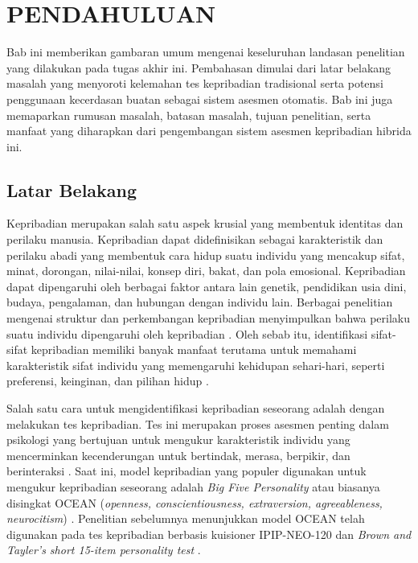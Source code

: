 \chapter{PENDAHULUAN}
\label{chap:pendahuluan}

Bab ini memberikan gambaran umum mengenai keseluruhan landasan penelitian yang dilakukan pada tugas akhir ini. Pembahasan dimulai dari latar belakang masalah yang menyoroti kelemahan tes kepribadian tradisional serta potensi penggunaan kecerdasan buatan sebagai sistem asesmen otomatis. Bab ini juga memaparkan rumusan masalah, batasan masalah, tujuan penelitian, serta manfaat yang diharapkan dari pengembangan sistem asesmen kepribadian hibrida ini.

\section{Latar Belakang}
\label{sec:latarbelakang}

Kepribadian merupakan salah satu aspek krusial yang membentuk identitas dan perilaku manusia. Kepribadian dapat didefinisikan sebagai karakteristik dan perilaku abadi yang membentuk cara hidup suatu individu yang mencakup sifat, minat, dorongan, nilai-nilai, konsep diri, bakat, dan pola emosional. Kepribadian dapat dipengaruhi oleh berbagai faktor antara lain genetik, pendidikan usia dini, budaya, pengalaman, dan hubungan dengan individu lain. Berbagai penelitian mengenai struktur dan perkembangan kepribadian menyimpulkan bahwa perilaku suatu individu dipengaruhi oleh kepribadian \parencite{apa-personality}. Oleh sebab itu, identifikasi sifat-sifat kepribadian memiliki banyak manfaat terutama untuk memahami karakteristik sifat individu yang memengaruhi kehidupan sehari-hari, seperti preferensi, keinginan, dan pilihan hidup \parencite{Ilmini2024}.

Salah satu cara untuk mengidentifikasi kepribadian seseorang adalah dengan melakukan tes kepribadian. Tes ini merupakan proses asesmen penting dalam psikologi yang bertujuan untuk mengukur karakteristik individu yang mencerminkan kecenderungan untuk bertindak, merasa, berpikir, dan berinteraksi \parencite{Krishnamurthy2022}. Saat ini, model kepribadian yang populer digunakan untuk mengukur kepribadian seseorang adalah \textit{Big Five Personality} atau biasanya disingkat OCEAN (\textit{openness, conscientiousness, extraversion, agreeableness, neurocitism}) \parencite{Suman2022,Ilmini2024}. Penelitian sebelumnya menunjukkan model OCEAN telah digunakan pada tes kepribadian berbasis kuisioner IPIP-NEO-120 dan \textit{Brown and Tayler's short 15-item personality test} \parencite{Hilliard2022,Bose2023}.


